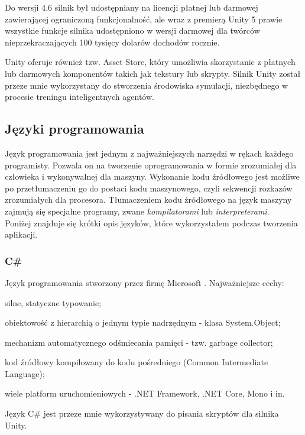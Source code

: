 Do wersji 4.6 silnik był udostępniany na licencji płatnej lub darmowej zawierającej ograniczoną funkcjonalność, ale wraz z premierą Unity 5 prawie wszystkie funkcje silnika udostępniono w wersji darmowej dla twórców nieprzekraczających 100 tysięcy dolarów dochodów rocznie.

Unity oferuje również tzw. Asset Store, który umożliwia skorzystanie z płatnych lub darmowych komponentów takich jak tekstury lub skrypty. Silnik Unity został przeze mnie wykorzystany do stworzenia środowiska symulacji, niezbędnego w procesie treningu inteligentnych agentów.

\subsection{Języki programowania}
Język programowania jest jednym z najważniejszych narzędzi w rękach każdego programisty. Pozwala on na tworzenie oprogramowania w formie zrozumiałej dla człowieka i wykonywalnej dla maszyny.
Wykonanie kodu źródłowego jest możliwe po przetłumaczeniu go do postaci kodu maszynowego, czyli sekwencji rozkazów zrozumiałych dla procesora. Tłumaczeniem kodu źródłowego na język maszyny zajmują się specjalne programy, zwane \textit{kompilatorami} lub  \textit{interpreterami}. \\
Poniżej znajduje się krótki opis języków, które wykorzystałem podczas tworzenia aplikacji.

\subsubsection{C\#}
Język programowania stworzony przez firmę Microsoft \cite{csharp:wikipedia}. Najważniejsze cechy:
\begin{itemize*}
\item silne, statyczne typowanie;
\item obiektowość z hierarchią o jednym typie nadrzędnym - klasa System.Object;
\item mechanizm automatycznego odśmiecania pamięci - tzw. garbage collector;
\item kod źródłowy kompilowany do kodu pośredniego (Common Intermediate Language);
\item wiele platform uruchomieniowych - .NET Framework, .NET Core, Mono i in.
\end{itemize*}
Język C\# jest przeze mnie wykorzystywany do pisania skryptów dla silnika Unity.

